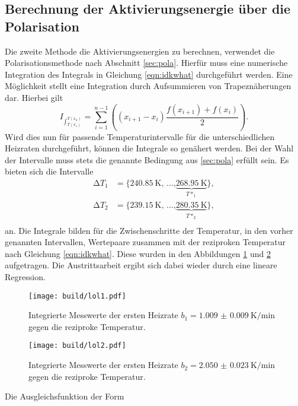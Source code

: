 \subsection{Berechnung der Aktivierungsenergie über die Polarisation}
Die zweite Methode die Aktivierungsenergien zu berechnen, verwendet die Polarisationsmethode nach Abschnitt \ref{sec:pola}. Hierfür muss eine numerische 
Integration des Integrals in Gleichung \eqref{eqn:idkwhat} durchgeführt werden. Eine Möglichkeit stellt eine Integration durch
Aufsummieren von Trapeznäherungen dar. Hierbei gilt 
\begin{equation}
I_{\int_{T(x_1)}^{T(x_n)}} = \sum_{i=1}^{n-1} \left( (x_{i+1} - x_{i}) \frac{f(x_{i+1}) + f(x_{i})}{2}\right).
\end{equation}
Wird dies nun für passende Temperaturintervalle für die unterschiedlichen Heizraten durchgeführt, können die Integrale so genähert werden.
Bei der Wahl der Intervalle muss stets die genannte Bedingung aus \ref{sec:pola} erfüllt sein. Es bieten sich die Intervalle
\begin{align*}
\increment T_1 &= \{\SI{240.85}{\kelvin}\text{, ...,} \underbrace{\SI{268.95}{\kelvin}}_{T*_1}\}, \\
\increment T_2 &= \{\SI{239.15}{\kelvin}\text{, ...,} \underbrace{\SI{280.35}{\kelvin}}_{T*_2}\}, \\
\end{align*}
an. Die Integrale bilden für die Zwischenschritte der Temperatur, in den vorher genannten Intervallen, Wertepaare zusammen mit der reziproken Temperatur nach 
Gleichung \eqref{eqn:idkwhat}. Diese wurden in den Abbildungen \ref{fig:lol1} und \ref{fig:lol2} aufgetragen. Die Austrittsarbeit ergibt sich dabei wieder durch eine lineare 
Regression.
\begin{figure}
    \centering
    \texttt{[image: build/lol1.pdf]}
    \caption{Integrierte Messwerte der ersten Heizrate \newline $b_1 = \SI{1.009(9)}{\kelvin\per\minute}$ gegen die reziproke Temperatur.
            }
    \label{fig:lol1}
\end{figure}
\begin{figure}
    \centering
    \texttt{[image: build/lol2.pdf]}
    \caption{Integrierte Messwerte der ersten Heizrate \newline $b_2 = \SI{2.050(23)}{\kelvin\per\minute}$ gegen die reziproke Temperatur.
            }
    \label{fig:lol2}
\end{figure}
Die Ausgleichsfunktion der Form
